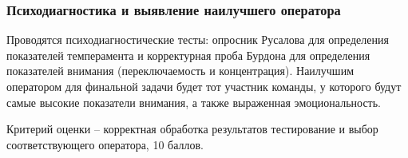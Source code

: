\subsubsection*{Психодиагностика и выявление наилучшего оператора}

Проводятся психодиагностические тесты: опросник Русалова для определения показателей темперамента и корректурная проба Бурдона для определения показателей внимания (переключаемость и концентрация). Наилучшим оператором для финальной задачи будет тот участник команды, у которого будут самые высокие показатели внимания, а также выраженная эмоциональность.

Критерий оценки – корректная обработка результатов тестирование и выбор соответствующего оператора, 10 баллов.